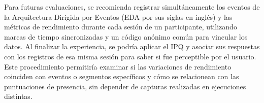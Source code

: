 Para futuras evaluaciones, se recomienda registrar simultáneamente los eventos de la Arquitectura Dirigida por Eventos (EDA por sus siglas en inglés) y las métricas de rendimiento durante cada sesión de un participante, 
utilizando marcas de tiempo sincronizadas y un código anónimo común para vincular los datos. 
Al finalizar la experiencia, se podría aplicar el IPQ y asociar sus respuestas con los registros de esa misma sesión para saber si fue perceptible por el usuario.
Este procedimiento permitiría examinar si las variaciones de rendimiento coinciden con eventos o segmentos específicos y cómo se relacionean con las puntuaciones de presencia, sin depender de capturas realizadas en ejecuciones distintas. 
